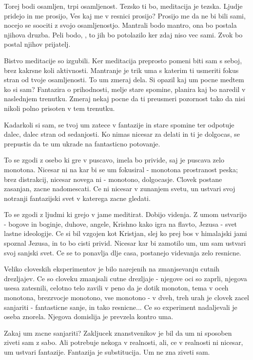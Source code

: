 Torej bodi osamljen, trpi osamljenost. Tezsko ti bo, meditacija je tezska. Ljudje pridejo in me prosijo,  Ves kaj me v resnici prosijo? Prosijo me da ne bi bili sami, nocejo se soociti z svojo osamljenostjo. Mantrali bodo mantro, ona bo postala njihova druzba. Peli bodo, , to jih bo potolazilo ker zdaj niso vec sami. Zvok  bo postal njihov prijatelj. 

Bistvo meditacije so izgubili. Ker meditacija preprosto pomeni biti sam s seboj, brez kakrsne koli aktivnosti. Mantranje je trik uma s katerim ti usmeriti fokus stran od tvoje osamljenosti. To um zmeraj dela. Si opazil kaj um pocne medtem ko si sam? Fantazira o prihodnosti, melje stare spomine, planira kaj bo naredil v naslednjem trenutku. Zmeraj nekaj pocne da ti preusmeri pozornost tako da nisi nikoli polno prisoten v tem trenutku. 

Kadarkoli si sam, se tvoj um zatece v fantazije in stare spomine ter odpotuje dalec, dalec stran od sedanjosti. Ko nimas nicesar za delati in ti je dolgocas, se prepustis da te um ukrade na fantasticno potovanje. 

To se zgodi z osebo ki gre v puscavo, imela bo privide, saj je puscava zelo monotona. Nicesar ni na kar bi se um fokusiral - monotona prostranost peska; brez distrakcij, nicesar novega ni - monotono, dolgocasje. Clovek postane zasanjan, zacne nadomescati. Ce ni nicesar v zunanjem svetu, un ustvari svoj notranji fantazijski svet v katerega zacne gledati. 

To se zgodi z ljudmi ki grejo v jame meditirat. Dobijo videnja. Z umom ustvarijo - bogove in boginje, duhove, angele, Krishno kako igra na flavto, Jezusa - svet lastne ideologije. Ce si bil vzgojen kot Kristjan, slej ko prej bos v himalajski jami spoznal Jezusa, in to bo cisti privid. Nicesar kar bi zamotilo um, um sam ustvari svoj sanjski svet. Ce se to ponavlja dlje casa, postanejo videvanja zelo resnicne. 

Veliko cloveskih eksperimentov je bilo narejenih na zmanjsevanju cutnih drezljajev. Ce so cloveku zmanjsali cutne drezljaje - njegove oci so zaprli, njegova usesa zatesnili, celotno telo zavili v peno da je dotik monoton, tema v oceh monotona, brezzvocje monotono, vse monotono - v dveh, treh urah je clovek zacel sanjariti - fantasticne sanje, in tako resnicne...  Ce so experiment nadaljevali je oseba znorela. Njegova domislija je prevzela kontro uma. 

Zakaj um zacne sanjariti? Zakljucek znanstvenikov je bil da um ni sposoben ziveti sam z sabo. Ali potrebuje nekoga v realnosti, ali, ce v realnosti ni nicesar, um ustvari fantazije. Fantazija je substitucija. Um ne zna ziveti sam. 

